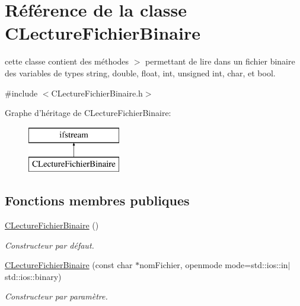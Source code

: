 \hypertarget{class_c_lecture_fichier_binaire}{\section{Référence de la classe C\-Lecture\-Fichier\-Binaire}
\label{class_c_lecture_fichier_binaire}
}


cette classe contient des méthodes $>$ permettant de lire dans un fichier binaire des variables de types string, double, float, int, unsigned int, char, et bool.  




{\ttfamily \#include $<$C\-Lecture\-Fichier\-Binaire.\-h$>$}

Graphe d'héritage de C\-Lecture\-Fichier\-Binaire\-:\begin{figure}[H]
\begin{center}
\leavevmode
\includegraphics[height=2.000000cm]{class_c_lecture_fichier_binaire}
\end{center}
\end{figure}
\subsection*{Fonctions membres publiques}
\begin{DoxyCompactItemize}
\item 
\hyperlink{group__utilitaire_ga3a259905a2c14513846e6ecb8cf476ad}{C\-Lecture\-Fichier\-Binaire} ()
\begin{DoxyCompactList}\small\item\em Constructeur par défaut. \end{DoxyCompactList}\item 
\hyperlink{group__utilitaire_gac16ebab7b172408c2ba14605f61f0f84}{C\-Lecture\-Fichier\-Binaire} (const char $\ast$nom\-Fichier, openmode mode=std\-::ios\-::in$\vert$std\-::ios\-::binary)
\begin{DoxyCompactList}\small\item\em Constructeur par paramètre. \end{DoxyCompactList}\end{DoxyCompactItemize}
